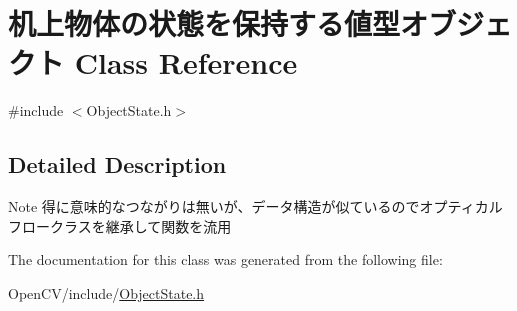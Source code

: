 \hypertarget{class_xE6_x9C_xBA_xE4_xB8_x8A_xE7_x89_xA9_xE4_xBD_x93_xE3_x81_xAE_xE7_x8A_xB6_xE6_x85_x8B_xE3_x8db069bd01051f325aba399d9080d849d}{}\section{机上物体の状態を保持する値型オブジェクト Class Reference}
\label{class_xE6_x9C_xBA_xE4_xB8_x8A_xE7_x89_xA9_xE4_xBD_x93_xE3_x81_xAE_xE7_x8A_xB6_xE6_x85_x8B_xE3_x8db069bd01051f325aba399d9080d849d}


{\ttfamily \#include $<$Object\+State.\+h$>$}



\subsection{Detailed Description}
\begin{DoxyNote}{Note}
得に意味的なつながりは無いが、データ構造が似ているのでオプティカルフロークラスを継承して関数を流用 
\end{DoxyNote}


The documentation for this class was generated from the following file\+:\begin{DoxyCompactItemize}
\item 
Open\+C\+V/include/\hyperlink{_object_state_8h}{Object\+State.\+h}\end{DoxyCompactItemize}
